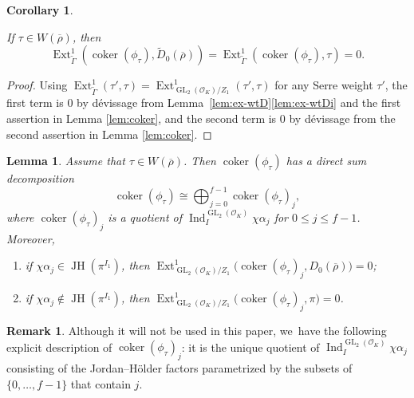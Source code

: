 \documentclass[JEP,XML,SOM,Unicode,NoFloatCountersInSection, NoEqCountersInSection,published]{cedram}
\let\wt\widetilde
\newcommand{\cO}{\mathcal{O}}
\newcommand{\brho}{\overline{\rho}}
\DeclareMathOperator{\coker}{coker}
\DeclareMathOperator{\Ext}{Ext}
\DeclareMathOperator{\GL}{GL}
\DeclareMathOperator{\Ind}{Ind}
\DeclareMathOperator{\JH}{\mathrm{JH}}
\theoremstyle{plain}
\newtheorem{lem}[prop]{Lemma}
\newtheorem{cor}[prop]{Corollary}
\theoremstyle{definition}
\newtheorem{rem}[prop]{Remark}
\begin{document}
\begin{cor}\label{cor:coker-ext1}

If $\tau\in W(\brho)$, then
\begin{equation*}
\Ext^1_{\wt{\Gamma}}(\coker(\phi_{\tau}),\wt{D}_0(\brho))=\Ext^1_{\wt{\Gamma}}(\coker(\phi_{\tau}),\tau)=0.
\end{equation*}
\end{cor}

\begin{proof}
Using $\Ext^1_{\wt{\Gamma}}(\tau',\tau)=\Ext^1_{\GL_2(\cO_K)/Z_1}(\tau',\tau)$ for any Serre weight $\tau'$, the first term is $0$ by dévissage from Lemma~\ref{lem:ex-wtD}\eqref{lem:ex-wtDi} and the first assertion in Lemma \ref{lem:coker}, and the second term is $0$ by dévissage from the second assertion in Lemma \ref{lem:coker}.
\end{proof}

\begin{lem}\label{lem:coker-j}
Assume that $\tau\in W(\brho)$.
Then $\coker(\phi_{\tau})$ has a direct sum decomposition
\begin{equation}\label{eq:coker-decomp}
\coker(\phi_{\tau})\cong \bigoplus_{j=0}^{f-1}\coker(\phi_{\tau})_j,
\end{equation}
where $\coker(\phi_{\tau})_j$ is a quotient of $\Ind_I^{\GL_2(\cO_K)}\chi\alpha_j$ for $0\leq j\leq f-1$. Moreover,
\begin{enumerate}
\item\label{lem:coker-ji} if $\chi\alpha_j\in\JH(\pi^{I_1})$, then $\Ext^1_{\GL_2(\cO_K)/Z_1}\bigl(\coker(\phi_\tau)_j,D_0(\brho)\bigr)=0$;
\item\label{lem:coker-jii} if $\chi\alpha_j\notin \JH(\pi^{I_1})$, then $\Ext^1_{\GL_2(\cO_K)/Z_1}\bigl(\coker(\phi_\tau)_j,\pi\bigr)=0$.
\end{enumerate}
\end{lem}
\begin{rem}
Although it will not be used in this paper, we~have the following explicit description of $\coker(\phi_\tau)_j$: it is the unique quotient of $\Ind_I^{\GL_2(\cO_K)}\chi\alpha_j$ consisting of the Jordan--Hölder factors parametrized by the subsets of $\{0,\dots,f-1\}$ that contain $j$.
\end{rem}
\end{document}
